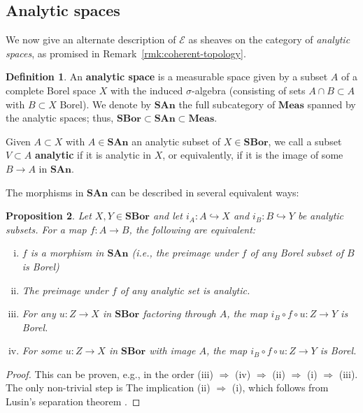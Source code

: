 \documentclass[11pt]{amsart}
\newcommand\cE{\mathcal{E}}
\newcommand\defword[1]{\textbf{#1}}
\newcommand\hto{\hookrightarrow}
\newcommand\Meas{\mathbf{Meas}}
\newcommand\SAn{\mathbf{SAn}}
\newcommand\SBor{\mathbf{SBor}}
\newcommand\To{\Rightarrow}
\theoremstyle{definition}
\newtheorem{defn}{Definition}[section]
\theoremstyle{remark}
\theoremstyle{plain}
\newtheorem{propn}[defn]{Proposition}
\begin{document}
\subsection{Analytic spaces} \label{subsec:analytic}
We now give an alternate description of \( \cE \) as sheaves on the category of \emph{analytic spaces}, as promised in Remark~\ref{rmk:coherent-topology}.
\begin{defn}
  An \defword{analytic space} is a measurable space given by a subset \( A \) of a complete Borel space \( X \) with the induced \( \sigma \)-algebra (consisting of sets \( A \cap B \subset A \) with \( B \subset X \) Borel).
  We denote by \( \SAn \) the full subcategory of \( \Meas \) spanned by the analytic spaces; thus, \( \SBor \subset \SAn \subset \Meas \).

  Given \( A \subset X \) with \( A \in \SAn \) an analytic subset of \( X \in \SBor \), we call a subset \( V \subset A \) \defword{analytic} if it is analytic in \( X \), or equivalently, if it is the image of some \( B \to A \) in \( \SAn \).
\end{defn}
\noindent
The morphisms in \( \SAn \) can be described in several equivalent ways:
\begin{propn} \label{propn:san-mor-chars}
  Let \( X,Y \in \SBor \) and let \( i_A \colon A \hto X \) and \( i_B \colon B \hto Y \) be analytic subsets.
  For a map \( f \colon A \to B \), the following are equivalent:
  \begin{enumerate}[(i)]
  \item \( f \) is a morphism in \( \SAn \) (i.e., the preimage under \( f \) of any Borel subset of \( B \) is Borel)
  \item The preimage under \( f \) of any analytic set is analytic.
  \item \label{item:ana-as-subsheaf} For any \( u \colon Z \to X \) in \( \SBor \) factoring through \( A \), the map \( i_B \circ f \circ u \colon Z \to Y \) is Borel.
  \item For \emph{some} \( u \colon Z \to X \) in \( \SBor \) with image \( A \), the map \( i_B \circ f \circ u \colon Z \to Y \) is Borel.
  \end{enumerate}
\end{propn}
\noindent

\begin{proof}
This can be proven, e.g., in the order
(iii) \( \To \) (iv) \( \To \) (ii) \( \To \) (i) \( \To \) (iii).
The only non-trivial step is
The implication (ii) \( \To \) (i), which follows from Lusin's separation theorem \cite[Theorem~14.7]{kechris-classical}.
\end{proof}
\end{document}
